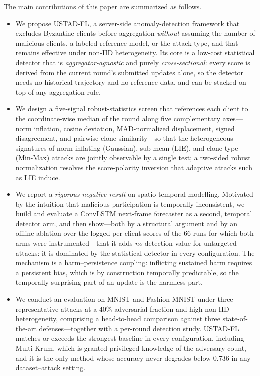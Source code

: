 \documentclass[journal]{IEEEtran}
\begin{document}
The main contributions of this paper are summarized as follows.
\begin{itemize}
    \item We propose USTAD-FL, a server-side anomaly-detection framework that excludes Byzantine clients before aggregation \emph{without} assuming the number of malicious clients, a labeled reference model, or the attack type, and that remains effective under non-IID heterogeneity. Its core is a low-cost statistical detector that is \emph{aggregator-agnostic} and purely \emph{cross-sectional}: every score is derived from the current round's submitted updates alone, so the detector needs no historical trajectory and no reference data, and can be stacked on top of any aggregation rule.
    \item We design a five-signal robust-statistics screen that references each client to the coordinate-wise median of the round along five complementary axes---norm inflation, cosine deviation, MAD-normalized displacement, signed disagreement, and pairwise clone similarity---so that the heterogeneous signatures of norm-inflating (Gaussian), sub-mean (LIE), and clone-type (Min-Max) attacks are jointly observable by a single test; a two-sided robust normalization resolves the score-polarity inversion that adaptive attacks such as LIE induce.
    \item We report a \emph{rigorous negative result} on spatio-temporal modelling. Motivated by the intuition that malicious participation is temporally inconsistent, we build and evaluate a ConvLSTM next-frame forecaster as a second, temporal detector arm, and then show---both by a structural argument and by an offline ablation over the logged per-client scores of the $66$ runs for which both arms were instrumented---that it adds \emph{no} detection value for untargeted attacks: it is dominated by the statistical detector in every configuration. The mechanism is a harm--persistence coupling: inflicting sustained harm requires a persistent bias, which is by construction temporally predictable, so the temporally-surprising part of an update is the harmless part.
    \item We conduct an evaluation on MNIST and Fashion-MNIST under three representative attacks at a $40\%$ adversarial fraction and high non-IID heterogeneity, comprising a head-to-head comparison against three state-of-the-art defenses---together with a per-round detection study. USTAD-FL matches or exceeds the strongest baseline in every configuration, including Multi-Krum, which is granted privileged knowledge of the adversary count, and it is the only method whose accuracy never degrades below $0.736$ in any dataset--attack setting.
\end{itemize}
\end{document}
